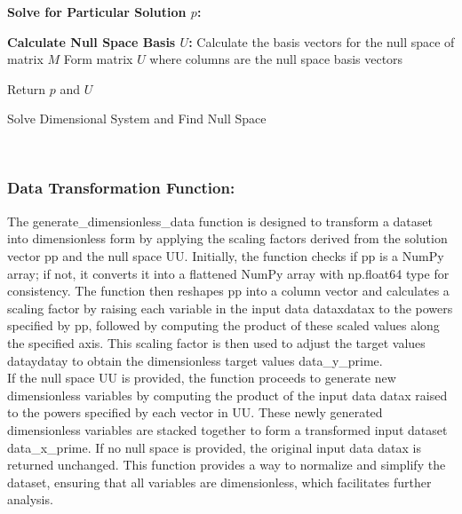 \documentclass{article}
\begin{document}
\begin{algorithm}[H]
\SetAlgoLined
{}

\textbf{Solve for Particular Solution \(p\):}\;

\textbf{Calculate Null Space Basis \(U\):}\;
Calculate the basis vectors for the null space of matrix \(M\)\;
Form matrix \(U\) where columns are the null space basis vectors\;

Return \(p\) and \(U\)\;

\caption{Solve Dimensional System and Find Null Space}
\label{alg:solve_dimension} %
\end{algorithm}\\






\subsubsection{Data Transformation Function:}

The generate\_dimensionless\_data function is designed to transform a dataset into dimensionless form by applying the scaling factors derived from the solution vector pp and the null space UU. Initially, the function checks if pp is a NumPy array; if not, it converts it into a flattened NumPy array with np.float64 type for consistency. The function then reshapes pp into a column vector and calculates a scaling factor by raising each variable in the input data dataxdatax​ to the powers specified by pp, followed by computing the product of these scaled values along the specified axis. This scaling factor is then used to adjust the target values dataydatay​ to obtain the dimensionless target values data\_y\_prime.\\

If the null space UU is provided, the function proceeds to generate new dimensionless variables by computing the product of the input data datax raised to the powers specified by each vector in UU. These newly generated dimensionless variables are stacked together to form a transformed input dataset data\_x\_prime. If no null space is provided, the original input data datax is returned unchanged. This function provides a way to normalize and simplify the dataset, ensuring that all variables are dimensionless, which facilitates further analysis.\\
\end{document}
